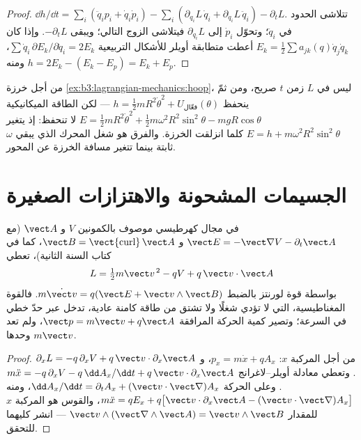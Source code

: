 \begin{proof}
$\dd h/\dd t = \sum_i(\ddot q_ip_i + \dot q_i\dot p_i) -
\sum_i(\partial_{q_i}L\,\dot q_i + \partial_{\dot q_i}L\,\ddot q_i) -
\partial_tL$. تتلاشى الحدود في $\ddot q_i$؛ وتحوّل  $\dot p_i$ إلى $\partial_{q_i}L$ فيتلاشى الزوج
التالي؛ ويبقى $-\partial_tL$. وإذا كان $E_k = \tfrac12\sum a_{jk}(q)\dot
q_j\dot q_k$ أعطت متطابقة أويلر للأشكال التربيعية $\sum\dot
q_i\,\partial E_k/\partial\dot q_i = 2E_k$، ومنه $h = 2E_k - (E_k - E_p)
= E_k + E_p$.
\end{proof}

\begin{example}\label{ex:b3:lagrangian-mechanics:hoop-energy}
من أجل خرزة \cref{ex:b3:lagrangian-mechanics:hoop}، ليس في $L$
زمن $t$ صريح، ومن ثمّ ينحفظ $h = \tfrac12 mR^2\dot\theta^2 + U_{\text{فعّال}}
(\theta)$ --- لكن الطاقة الميكانيكية $E = \tfrac12
mR^2\dot\theta^2 + \tfrac12 m\omega^2R^2\sin^2\theta - mgR\cos\theta$
لا تنحفظ: إذ يتغير $E = h + m\omega^2R^2\sin^2\theta$ كلما انزلقت
الخرزة. والفرق هو شغل المحرك الذي يبقي $\omega$ ثابتة بينما تتغير
مسافة الخرزة عن المحور.
\end{example}

\section{الجسيمات المشحونة والاهتزازات الصغيرة}

\begin{proposition}\label{prop:b3:lagrangian-mechanics:charge}
في مجال كهرطيسي موصوف بالكمونين $V$ و
$\vect A$ (مع $\vect E = -\vect\nabla V - \partial_t\vect A$ و
$\vect B = \operatorname{\vect{curl}}\vect A$، كما في كتاب السنة
الثانية)، تعطي 
\[
L = \tfrac12 m\vect v^{\,2} - qV + q\,\vect v\cdot\vect A
\]
بواسطة  قوة لورنتز بالضبط
$m\dot{\vect v} = q(\vect E + \vect v\wedge\vect B)$. فالقوة
المغناطيسية، التي لا تؤدي شغلًا ولا تشتق من طاقة كامنة عادية،
تدخل عبر حدّ خطي في السرعة؛ وتصير كمية الحركة المرافقة
$\vect p = m\vect v + q\vect A$، ولم تعد
$m\vect v$ وحدها.
\end{proposition}

\begin{proof}
من أجل المركبة $x$: $p_x = m\dot x + qA_x$، و
$\partial_xL = -q\,\partial_xV + q\,\vect v\cdot\partial_x\vect A$.
وتعطي معادلة أويلر--لاغرانج $m\ddot x = -q\,\partial_xV -
q\,\dd A_x/\dd t + q\,\vect v\cdot\partial_x\vect A$. وعلى الحركة
$\dd A_x/\dd t = \partial_tA_x + (\vect v\cdot\vect\nabla)A_x$، ومنه
$m\ddot x = qE_x + q\big[\vect v\cdot\partial_x\vect A - (\vect v\cdot
\vect\nabla)A_x\big]$، والقوس هو المركبة $x$ للمقدار $\vect
v\wedge(\vect\nabla\wedge\vect A) = \vect v\wedge\vect B$ --- انشر
كليهما للتحقق.
\end{proof}

